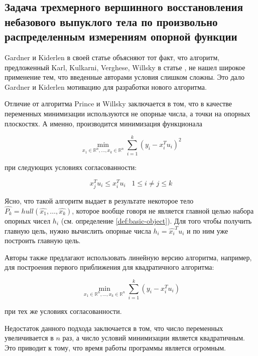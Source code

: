 \documentclass[a4paper, 12pt, titlepage]{article}
\theoremstyle{definition}
\theoremstyle{plain}
\theoremstyle{plain}
\begin{document}
\newpage
\subsection{Задача трехмерного вершинного восстановления небазового выпуклого
тела по произвольно распределенным измерениям опорной функции}
\label{sec:support-methods:3d-nonuniform-nonbasic}

Gardner и Kiderlen в своей статье \cite{journals/pami/GardnerK09} объясняют
тот факт, что алгоритм, предложенный Karl, Kulkarni, Verghese, Willsky в статье
\cite{journals/jmiv/KarlKVW96}, не нашел широкое применение тем, что
введенные авторами условия слишком сложны. Это дало Gardner и Kiderlen
мотивацию для разработки нового алгоритма.

Отличие от алгоритма Prince и Willsky заключается в том, что в качестве
переменных минимизации используются не опорные числа, а точки на опорных
плоскостях. А именно, производится минимизация функционала

\begin{equation}
 \min_{x_{1} \in \mathbb{R}^{n}, \ldots, x_{k} \in \mathbb{R}^{n}}
 \sum \limits_{i = 1}^{k} (y_{i} - x_{i}^{T} u_{i})^{2}
\end{equation}

при следующих условиях согласованности:

\begin{equation}
 x_{j}^{T} u_{i} \leq x_{i}^{T} u_{i} \;\;\; 1 \leq i \neq j \leq k
\end{equation}

Ясно, что такой алгоритм выдает в результате некоторое тело
$\widehat{P_{k}} = hull(\widehat{x_{1}}, \ldots, \widehat{x_{k}})$, которое
вообще говоря не является главной целью набора опорных чисел $h_{i}$ (см.
определение \ref{def:basic-object}). Для того чтобы получить главную цель,
нужно вычислить опорные числа $h_{i} = \widehat{x_{i}}^{T} u_{i}$ и по ним уже
построить главную цель.

Авторы также предлагают использовать линейную версию алгоритма, например, для
построения первого приближения для квадратичного алгоритма:

\begin{equation}
 \min_{x_{1} \in \mathbb{R}^{n}, \ldots, x_{k} \in \mathbb{R}^{n}}
 \sum \limits_{i = 1}^{k} (y_{i} - x_{i}^{T} u_{i})
\end{equation}

при тех же условиях согласованности.

Недостаток данного подхода заключается в том, что число переменных
увеличивается в $n$ раз, а число условий минимизации является квадратичным. Это
приводит к тому, что время работы программы является огромным.
\end{document}
